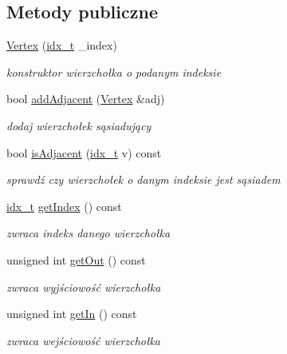 \subsection*{Metody publiczne}
\begin{DoxyCompactItemize}
\item 
\hyperlink{classVertex_a4c8fc5e2511870e41a1f9a74116e9163}{Vertex} (\hyperlink{classVertex_a12fe2194264f72b70b284bba723052c1}{idx\-\_\-t} \-\_\-index)
\begin{DoxyCompactList}\small\item\em konstruktor wierzchołka o podanym indeksie \end{DoxyCompactList}\item 
bool \hyperlink{classVertex_a5be3d42eadcf36caa7af80227e02ad7a}{add\-Adjacent} (\hyperlink{classVertex}{Vertex} \&adj)
\begin{DoxyCompactList}\small\item\em dodaj wierzchołek sąsiadujący \end{DoxyCompactList}\item 
bool \hyperlink{classVertex_a40b130e700edabcc716e427a363aed7f}{is\-Adjacent} (\hyperlink{classVertex_a12fe2194264f72b70b284bba723052c1}{idx\-\_\-t} v) const 
\begin{DoxyCompactList}\small\item\em sprawdź czy wierzchołek o danym indeksie jest sąsiadem \end{DoxyCompactList}\item 
\hyperlink{classVertex_a12fe2194264f72b70b284bba723052c1}{idx\-\_\-t} \hyperlink{classVertex_a7fc1d1b1f8b06a1f78828959447ebab4}{get\-Index} () const 
\begin{DoxyCompactList}\small\item\em zwraca indeks danego wierzchołka \end{DoxyCompactList}\item 
unsigned int \hyperlink{classVertex_ab934b969ce0a7ca993f68415ac2ef7a7}{get\-Out} () const 
\begin{DoxyCompactList}\small\item\em zwraca wyjściowość wierzchołka \end{DoxyCompactList}\item 
unsigned int \hyperlink{classVertex_a2f2ba2a945262eb1ad0cf85cba463aa6}{get\-In} () const 
\begin{DoxyCompactList}\small\item\em zwraca wejściowość wierzchołka \end{DoxyCompactList}\item 

\end{DoxyCompactItemize}
